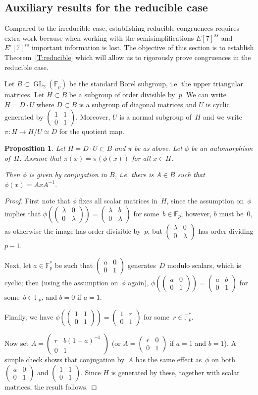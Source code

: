 \documentclass[12pt, reqno]{amsart}
\newcommand{\Fp}{\mathbb{F}_p}
\newcommand{\Fpstar}{\mathbb{F}_p^*}
\newcommand{\GL}{\operatorname{GL}}
\newcommand{\mat}[4]{{\left(\begin{smallmatrix} #1 & #2 \\ #3 & #4 \end{smallmatrix} \right)}}
\numberwithin{equation}{section}
\newtheorem{proposition}[theorem]{Proposition}
\theoremstyle{definition}
\theoremstyle{remark}
\begin{document}
\subsection{Auxiliary results for the reducible case}
Compared to the irreducible case, establishing reducible congruences
requires extra work because when working with the semisimplifications
$E[7]^{ss}$ and $E'[7]^{ss}$ important information is lost.  The
objective of this section is to establish Theorem~\ref{T:reducible}
which will allow us to rigorously prove congruences in the reducible
case.


Let $B \subset \GL_2(\Fp)$ be the standard Borel subgroup, i.e. the
upper triangular matrices. Let $H \subset B$ be a subgroup of order
divisible by~$p$.  We can write~$H = D\cdot U$ where $D \subset B$ is
a subgroup of diagonal matrices and $U$ is cyclic generated by
$\mat{1}{1}{0}{1}$.  Moreover, $U$ is a normal subgroup of~$H$ and we
write $\pi : H \to H/U \simeq D$ for the quotient map.

\begin{proposition} \label{P:inner}
Let $H = D \cdot U \subset B$ and $\pi$ be as above. 
Let $\phi$ be an automorphism of~$H$. Assume that  
$\pi(x) = \pi(\phi(x))$ for all $x \in H$. 

Then $\phi$ is given by conjugation in $B$, i.e. there is $A \in B$ such that $\phi(x) = AxA^{-1}$. 
\end{proposition}
\begin{proof}
First note that $\phi$ fixes all scalar matrices in~$H$, since the
assumption on~$\phi$ implies that $\phi(\mat{\lambda}{0}{0}{\lambda})
= \mat{\lambda}{b}{0}{\lambda}$ for some~$b\in\Fp$; however, $b$ must
be~$0$, as otherwise the image has order divisible by~$p$, but $\mat{\lambda}{0}{0}{\lambda}$ has order dividing $p-1$.

Next, let $a\in\Fpstar$ be such that $\mat{a}{0}{0}{1}$ generates~$D$
modulo scalars, which is cyclic; then (using the assumption on~$\phi$
again), $\phi(\mat{a}{0}{0}{1}) = \mat{a}{b}{0}{1}$ for
some~$b\in\Fp$, and $b=0$ if $a=1$.

Finally, we have $\phi(\mat{1}{1}{0}{1}) = \mat{1}{r}{0}{1}$ for
some~$r\in\Fpstar$.

Now set $A=\mat{r}{b(1-a)^{-1}}{0}{1}$ (or $A=\mat{r}{0}{0}{1}$ if
$a=1$ and $b=1$).  A simple check shows that conjugation by~$A$ has
the same effect as~$\phi$ on both $\mat{a}{0}{0}{1}$ and
$\mat{1}{1}{0}{1}$.  Since $H$ is generated by these, together with
scalar matrices, the result follows.
\end{proof}
\end{document}
